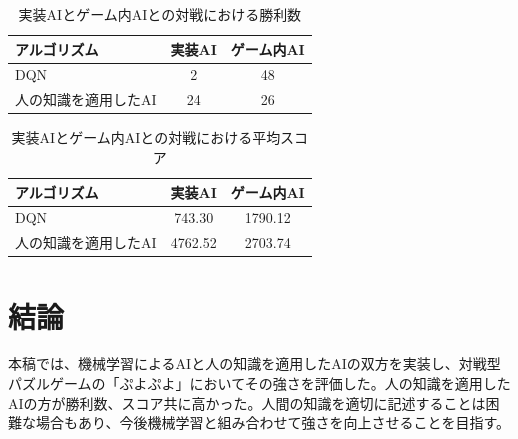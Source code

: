 \documentclass[twocolumn, a4paper]{UECIEresume}
\begin{document}
\begin{table}[htb]
\begin{center}
\caption{実装AIとゲーム内AIとの対戦における勝利数} \label{tab:win}
  \begin{tabular}{|l|c|c|} \hline
アルゴリズム & 実装AI & ゲーム内AI\\ \hline
DQN & 2 & 48\\ \hline
人の知識を適用したAI & 24 & 26\\ \hline
\end{tabular}
\end{center}
\end{table}


\begin{table}[htb]
\begin{center}
\caption{実装AIとゲーム内AIとの対戦における平均スコア} \label{tab:score}
  \begin{tabular}{|l|c|c|} \hline
アルゴリズム & 実装AI & ゲーム内AI\\ \hline
DQN & 743.30 & 1790.12\\ \hline
人の知識を適用したAI & 4762.52 & 2703.74\\ \hline
\end{tabular}
\end{center}
\end{table}


\section{結論}
本稿では、機械学習によるAIと人の知識を適用したAIの双方を実装し、対戦型パズルゲームの「ぷよぷよ」においてその強さを評価した。人の知識を適用したAIの方が勝利数、スコア共に高かった。人間の知識を適切に記述することは困難な場合もあり、今後機械学習と組み合わせて強さを向上させることを目指す。



{\small


}
\end{document}
